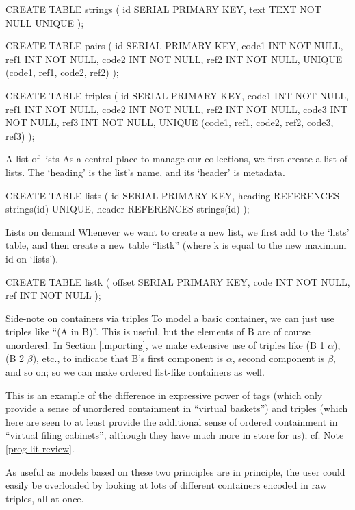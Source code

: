 \begin{idea}
CREATE TABLE strings (
   id SERIAL PRIMARY KEY,
   text TEXT NOT NULL UNIQUE
);

CREATE TABLE pairs (
   id SERIAL PRIMARY KEY,
   code1 INT NOT NULL,
   ref1 INT NOT NULL,
   code2 INT NOT NULL,
   ref2 INT NOT NULL,
   UNIQUE (code1, ref1,
           code2, ref2)
);

CREATE TABLE triples (
   id SERIAL PRIMARY KEY,
   code1 INT NOT NULL,
   ref1 INT NOT NULL,
   code2 INT NOT NULL,
   ref2 INT NOT NULL,
   code3 INT NOT NULL,
   ref3 INT NOT NULL,
   UNIQUE (code1, ref1,
           code2, ref2,
           code3, ref3)
);
\end{idea}

\begin{notate}{A list of lists}\label{models-of-theories}
As a central place to manage our collections, we first
create a list of lists.  The `heading' is the list's name,
and its `header' is metadata.
\end{notate}

\begin{idea}
CREATE TABLE lists (
  id SERIAL PRIMARY KEY,
  heading REFERENCES strings(id) UNIQUE,
  header REFERENCES strings(id) 
);
\end{idea}

\begin{notate}{Lists on demand}\label{models-of-theories}
Whenever we want to create a new list, we first add to the
`lists' table, and then create a new table ``listk''
(where k is equal to the new maximum id on `lists').
\end{notate}

\begin{idea}
CREATE TABLE listk (
   offset SERIAL PRIMARY KEY,
   code INT NOT NULL,
   ref INT NOT NULL
);
\end{idea}

\begin{notate}{Side-note on containers via triples}  \label{containers-using-triples}
To model a basic container, we can just use triples like
``(A in B)''.  This is useful, but the elements of B are
of course unordered.  In Section \ref{importing}, we make
extensive use of triples like (B 1 $\alpha$), (B 2
$\beta$), etc., to indicate that B's first component is
$\alpha$, second component is $\beta$, and so on; so we
can make ordered list-like containers as well.

This is an example of the difference in expressive power
of tags (which only provide a sense of unordered
containment in ``virtual baskets'') and triples (which
here are seen to at least provide the additional sense of
ordered containment in ``virtual filing cabinets'',
although they have much more in store for us); cf. Note
\ref{prog-lit-review}.

As useful as models based on these two principles are in
principle, the user could easily be overloaded by looking
at lots of different containers encoded in raw triples,
all at once.
\end{notate}

